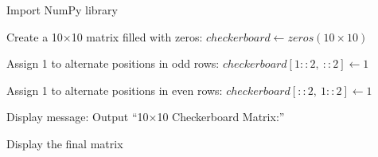 \begin{algorithm}
\caption{Create a 10×10 Checkerboard Matrix using NumPy}
\begin{algorithmic}[1]

\STATE Import NumPy library

\STATE Create a 10×10 matrix filled with zeros:
\STATE $checkerboard \gets zeros(10 \times 10)$

\STATE Assign 1 to alternate positions in odd rows:
\STATE $checkerboard[1::2,\ ::2] \gets 1$

\STATE Assign 1 to alternate positions in even rows:
\STATE $checkerboard[::2,\ 1::2] \gets 1$

\STATE Display message:
\STATE Output ``10×10 Checkerboard Matrix:''

\STATE Display the final matrix

\end{algorithmic}
\end{algorithm}